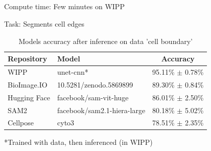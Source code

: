 \subsection{\slidetitle}
\begin{frame}
  \frametitle{\sectiontitle}
  \framesubtitle{\slidetitle}

  Compute time: Few minutes on WIPP

  Task: Segments cell edges

  \begin{center}
    \begin{table}
      \begin{tabular}{|l|l|c|}
       \hline
       \rowcolor{tableFirstRowColor}  Repository    & Model                       & Accuracy \\ [0.5ex]
       \hline
       \cellcolor{tableFirstColColor} WIPP          & unet-cnn*                   & 95.11\% $\pm$ 0.78\% \\
       \hline
       \cellcolor{tableFirstColColor} BioImage.IO   & 10.5281/zenodo.5869899      & 89.30\% $\pm$ 0.84\% \\
       \hline
       \cellcolor{tableFirstColColor} Hugging Face  & facebook/sam-vit-huge       & 86.01\% $\pm$ 2.50\% \\
       \hline
       \hline
       \cellcolor{tableFirstColColor} SAM2          & facebook/sam2.1-hiera-large & 80.18\% $\pm$ 5.02\% \\
       \hline
       \cellcolor{tableFirstColColor} Cellpose      & cyto3                       & 78.51\% $\pm$ 2.35\% \\
       \hline
      \end{tabular}
      \caption{Models accuracy after inference on data 'cell boundary'}
    \end{table}
  \end{center}

  *Trained with data, then inferenced (in WIPP)

\end{frame}

\def\slidetitle{Data 'nuclei segmentation'}

